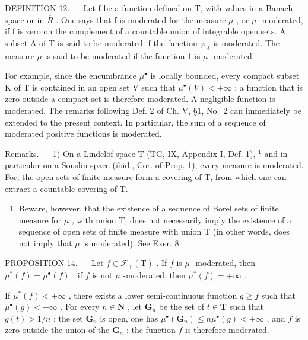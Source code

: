DEFINITION 12. --- Let f be a function defined on T, with values in a Banach space or in \(\overline{R}\) . One says that f is moderated for the measure \(\mu\) , or \(\mu\) -moderated, if f is zero on the complement of a countable union of integrable open sets. A subset A of T is said to be moderated if the function \(\varphi_{A}\) is moderated. The measure \(\mu\) is said to be moderated if the function 1 is \(\mu\) -moderated.

For example, since the encumbrance \(\mu^{\bullet}\) is locally bounded, every compact subset K of T is contained in an open set V such that \(\mu^{\bullet}(V)<+\infty\) ; a function that is zero outside a compact set is therefore moderated. A negligible function is moderated. The remarks following Def. 2 of Ch. V, §1, No.~2 can immediately be extended to the present context. In particular, the sum of a sequence of moderated positive functions is moderated.

Remarks. --- 1) On a Lindelöf space T (TG, IX, Appendix I, Def. 1), \(^{1}\) and in particular on a Souslin space (ibid., Cor. of Prop. 1), every measure is moderated. For, the open sets of finite measure form a covering of T, from which one can extract a countable covering of T.

\begin{enumerate}
\def\labelenumi{\arabic{enumi})}
\setcounter{enumi}{1}
\tightlist
\item
  Beware, however, that the existence of a sequence of Borel sets of finite measure for \(\mu\) , with union T, does not necessarily imply the existence of a sequence of open sets of finite measure with union T (in other words, does not imply that \(\mu\) is moderated). See Exer. 8.
\end{enumerate}

PROPOSITION 14. --- Let \(f \in \mathcal{F}_{+}(\mathrm{T})\) . If \(f\) is \(\mu\) -moderated, then \(\mu^{*}(f) = \mu^{\bullet}(f)\) ; if \(f\) is not \(\mu\) -moderated, then \(\mu^{*}(f) = +\infty\) .

If \(\mu^{*}(f) < +\infty\) , there exists a lower semi-continuous function \(g \geqslant f\) such that \(\mu^{\bullet}(g) < +\infty\) . For every \(n \in \mathbf{N}\) , let \(\mathbf{G}_{n}\) be the set of \(t \in \mathbf{T}\) such that \(g(t) > 1/n\) ; the set \(\mathbf{G}_{n}\) is open, one has \(\mu^{\bullet}(\mathbf{G}_{n}) \leqslant n\mu^{\bullet}(g) < +\infty\) , and \(f\) is zero outside the union of the \(\mathbf{G}_{n}\) : the function \(f\) is therefore moderated.

